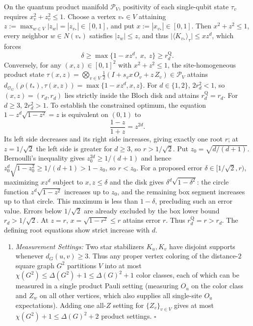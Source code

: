 \documentclass[
  11pt,
]{article}
\providecommand{\tightlist}{%
  \setlength{\itemsep}{0pt}\setlength{\parskip}{0pt}}
\providecommand{\tightlist}{%
  \setlength{\itemsep}{0pt}\setlength{\parskip}{0pt}}
\begin{document}
On the quantum product manifold \(\mathcal{P}_V\), positivity of each single-qubit state \(\tau_v\) requires \(x_v^2 + z_v^2 \le 1\). Choose a vertex \(v_* \in V\) attaining \(z := \max_{w\in V}|z_w| = |z_{v_*}| \in [0,1]\), and put \(x := |x_{v_*}| \in [0,1]\). Then \(x^2 + z^2 \le 1\), every neighbor \(w\in N(v_*)\) satisfies \(|z_w| \le z\), and thus \(\lvert\langle K_{v_*}\rangle_\tau\rvert \le x z^d\), which forces
\[
\delta \ge \max\bigl\{1 - x z^d,\; x,\; z\bigr\} \ge r_d^{\mathrm{Q}}.
\]
Conversely, for any \((x,z)\in[0,1]^2\) with \(x^2+z^2\le 1\), the site-homogeneous product state \(\tau(x,z) = \bigotimes_{v\in V}\frac{1}{2}(I + s_v x\,O_v + z\,Z_v) \in \mathcal{P}_V\) attains \(d_{\mathcal{O}_G}(\rho(t_*),\tau(x,z)) = \max\{1 - x z^d, x, z\}\). For \(d\in\{1,2\}\), \(2r_d^2 < 1\), so \((x,z)=(r_d,r_d)\) lies strictly inside the Bloch disk and attains \(r_d^{\mathrm{Q}} = r_d\). For \(d\ge3\), \(2r_d^2>1\). To establish the constrained optimum, the equation \(1-z^d\sqrt{1-z^2}=z\) is equivalent on \((0,1)\) to
\[
\frac{1-z}{1+z}=z^{2d}.
\]
Its left side decreases and its right side increases, giving exactly one root \(r\); at \(z=1/\sqrt2\) the left side is greater for \(d\ge3\), so \(r>1/\sqrt2\). Put \(z_0=\sqrt{d/(d+1)}\). Bernoulli's inequality gives \(z_0^{2d}\ge1/(d+1)\) and hence \(z_0^d\sqrt{1-z_0^2}\ge1/(d+1)>1-z_0\), so \(r<z_0\). For a proposed error \(\delta\in[1/\sqrt2,r)\), maximizing \(xz^d\) subject to \(x,z\le\delta\) and the disk gives \(\delta^d\sqrt{1-\delta^2}\): the circle function \(z^d\sqrt{1-z^2}\) increases up to \(z_0\), and the remaining box segment increases up to that circle. This maximum is less than \(1-\delta\), precluding such an error value. Errors below \(1/\sqrt2\) are already excluded by the box lower bound \(r_d>1/\sqrt2\). At \(z=r\), \(x=\sqrt{1-r^2}\le r\) attains error \(r\). Thus \(r_d^{\mathrm Q}=r>r_d\). The defining root equations show strict increase with \(d\).

\begin{enumerate}
\def\labelenumi{\arabic{enumi}.}
\setcounter{enumi}{2}
\tightlist
\item
  \emph{Measurement Settings:} Two star stabilizers \(K_u, K_v\) have disjoint supports whenever \(d_G(u,v) \ge 3\). Thus any proper vertex coloring of the distance-\(2\) square graph \(G^2\) partitions \(V\) into at most \(\chi(G^2) \le \Delta(G^2)+1 \le \Delta(G)^2+1\) color classes, each of which can be measured in a single product Pauli setting (measuring \(O_u\) on the color class and \(Z_w\) on all other vertices, which also supplies all single-site \(O_u\) expectations). Adding one all-\(Z\) setting for \(\{Z_v\}_{v\in V}\) gives at most \(\chi(G^2)+1 \le \Delta(G)^2+2\) product settings. \(\square\)
\end{enumerate}
\end{document}
